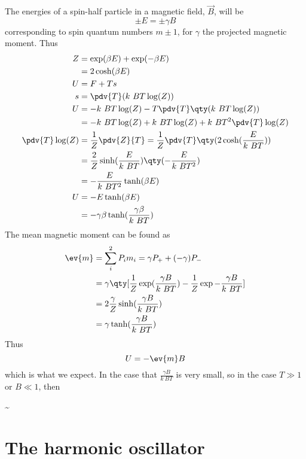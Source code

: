 The energies of a spin-half particle in a magnetic field, $\vec{B}$,
will be \[ \pm E = \pm \gamma B \] corresponding to spin quantum
numbers $m \pm 1$, for $\gamma$ the projected magnetic moment. Thus
\begin{align*}
  Z &= \exp(\beta E) + \exp(- \beta E) \\ &= 2 \cosh(\beta E) \\
U &= F + Ts \\ s &= \pdv{T} (k~B T \log(Z) ) \\
U &= -k~B T \log(Z) - T \pdv{T} \qty( k~B T \log(Z)) \\ &= - k~B T \log(Z) + k~B T \log(Z) + k~B T^2 \pdv{T} \log(Z) \\ 
\pdv{T} \log(Z) &= \frac{1}{Z} \pdv{Z}{T}= \frac{1}{Z} \pdv{T} \qty(2 \cosh(\frac{E}{k~B T}) ) \\
&= \frac{2}{Z} \sinh( \frac{E}{k~B T}) \qty( - \frac{E}{k~B T^2} ) \\
&= - \frac{E}{k~B T^2} \tanh( \beta E) \\
U &= - E \tanh(\beta E) \\ &= - \gamma \beta \tanh(\frac{ \gamma \beta }{k~B T} )
\end{align*}
The mean magnetic moment can be found as
\begin{align*}
  \ev{m} &= \sum_i^2 P_i m_i = \gamma P_+ + (- \gamma) P_- \\
&= \gamma \qty[ \frac{1}{Z} \exp(\frac{\gamma B}{k~B T}) - \frac{1}{Z} \exp- \frac{\gamma B}{k~B T}] \\
&= 2 \frac{\gamma}{Z} \sinh( \frac{\gamma B}{k~B T} ) \\
&= \gamma \tanh( \frac{\gamma B}{k~B T})
\end{align*}
Thus
\begin{equation}
  \label{eq:1}
  U = - \ev{m} B
\end{equation}
which is what we expect. In the case that $\frac{\gamma B}{k~B T}$ is
very small, so in the case $T \gg 1$ or $B \ll 1$, then
\begin{fequation}
  \label{eq:2}
   \approx {} \sim {}
\end{fequation}

\section{The harmonic oscillator}
\label{sec:harmonic-oscillator}

